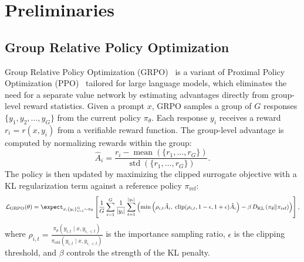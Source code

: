 \section{Preliminaries}
\label{sec:preliminary}

\subsection{Group Relative Policy Optimization}
Group Relative Policy Optimization (GRPO)~\cite{grpo} is a variant of Proximal Policy Optimization (PPO)~\cite{schulman2017proximalpolicyoptimizationalgorithms} tailored for large language models, which eliminates the need for a separate value network by estimating advantages directly from group-level reward statistics. Given a prompt $x$, GRPO samples a group of $G$ responses $\{y_1, y_2, \ldots, y_G\}$ from the current policy $\pi_\theta$. Each response $y_i$ receives a reward $r_i = r(x, y_i)$ from a verifiable reward function. The group-level advantage is computed by normalizing rewards within the group:
\begin{equation}
    \hat{A}_i = \frac{r_i - \operatorname{mean}(\{r_1, \ldots, r_G\})}{\operatorname{std}(\{r_1, \ldots, r_G\})}.
\end{equation}
The policy is then updated by maximizing the clipped surrogate objective with a KL regularization term against a reference policy $\pi_{\text{ref}}$:
\begin{equation}
    \mathcal{L}_{\text{GRPO}}(\theta) = \expect_{x, \{y_i\}_{i=1}^{G} \sim \pi_\theta} \left[ \frac{1}{G} \sum_{i=1}^{G} \frac{1}{|y_i|} \sum_{t=1}^{|y_i|} \left( \min\left( \rho_{i,t} \hat{A}_i,\; \text{clip}(\rho_{i,t}, 1-\epsilon, 1+\epsilon) \hat{A}_i \right) - \beta\, D_{\text{KL}}\left(\pi_\theta \| \pi_{\text{ref}}\right) \right) \right],
\end{equation}
where $\rho_{i,t} = \frac{\pi_\theta(y_{i,t} \mid x, y_{i,<t})}{\pi_{\text{old}}(y_{i,t} \mid x, y_{i,<t})}$ is the importance sampling ratio, $\epsilon$ is the clipping threshold, and $\beta$ controls the strength of the KL penalty.

